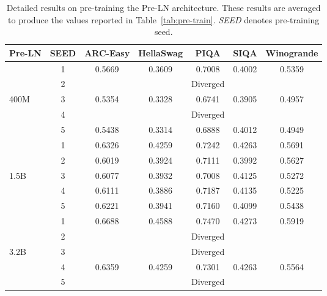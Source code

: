 \begin{table}[ht]
\vskip -0.1in
\small
    \centering
    \caption{Detailed results on pre-training the Pre-LN architecture. These results are averaged to produce the values reported in Table~\ref{tab:pre-train}. \textit{SEED} denotes pre-training seed.}
    \begin{tabular}{lcccccc}
    \toprule
        Pre-LN & SEED & ARC-Easy & HellaSwag & PIQA & SIQA & Winogrande \\ 
        \toprule
        ~ & 1 & 0.5669 & 0.3609 & 0.7008 & 0.4002 & 0.5359 \\ 
        ~ & 2 & ~ & ~ & Diverged & ~ & ~ \\ 
        400M & 3 & 0.5354 & 0.3328 & 0.6741 & 0.3905 & 0.4957 \\ 
        ~ & 4 & ~ & ~ & Diverged & ~ & ~ \\ 
        ~ & 5 & 0.5438 & 0.3314 & 0.6888 & 0.4012 & 0.4949 \\ 
        \midrule
        ~ & 1 & 0.6326 & 0.4259 & 0.7242 & 0.4263 & 0.5691 \\ 
        ~ & 2 & 0.6019 & 0.3924 & 0.7111 & 0.3992 & 0.5627 \\ 
        1.5B & 3 & 0.6077 & 0.3932 & 0.7008 & 0.4125 & 0.5272 \\ 
        ~ & 4 & 0.6111 & 0.3886 & 0.7187 & 0.4135 & 0.5225 \\ 
        ~ & 5 & 0.6221 & 0.3941 & 0.7160 & 0.4099 & 0.5438 \\ 
        \midrule
        ~ & 1 & 0.6688 & 0.4588 & 0.7470 & 0.4273 & 0.5919 \\ 
        ~ & 2 & ~ & ~ & Diverged & ~ & ~ \\ 
        3.2B & 3 & ~ & ~ & Diverged & ~ & ~ \\ 
        ~ & 4 & 0.6359 & 0.4259 & 0.7301 & 0.4263 & 0.5564 \\ 
        ~ & 5 & ~ & ~ & Diverged & ~ & ~ \\ 
        \bottomrule
    \end{tabular}
    \vskip -0.1in
\end{table}

